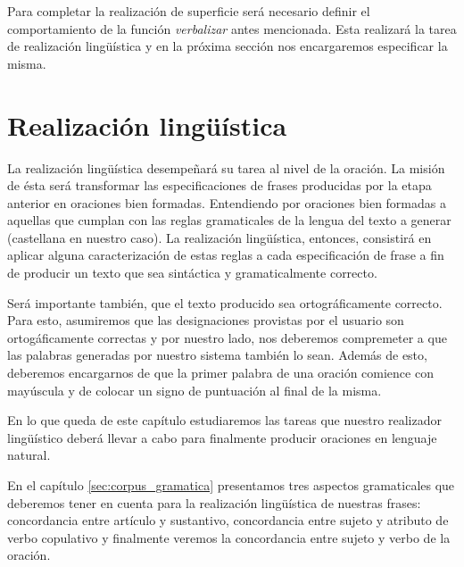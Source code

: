 Para completar la realización de superficie será necesario definir el comportamiento de la función \emph{verbalizar} antes mencionada. Esta realizará la tarea de realización lingüística y en la próxima sección nos encargaremos especificar la misma.





\section{Realización lingüística}
\label{cap:linguistic_realization}

La realización lingüística desempeñará su tarea al nivel de la oración. La misión de ésta será transformar las especificaciones de frases producidas por la etapa anterior en oraciones bien formadas. Entendiendo por oraciones bien formadas a aquellas que cumplan con las reglas gramaticales de la lengua del texto a generar (castellana en nuestro caso). La realización lingüística, entonces, consistirá en aplicar alguna caracterización de estas reglas a cada especificación de frase a fin de producir un texto que sea sintáctica y gramaticalmente correcto.

Será importante también, que el texto producido sea ortográficamente correcto. Para esto, asumiremos que las designaciones provistas por el usuario son ortogáficamente correctas y por nuestro lado, nos deberemos compremeter a que las palabras generadas por nuestro sistema también lo sean. Además de esto, deberemos encargarnos de que la primer palabra de una oración comience con mayúscula y de colocar un signo de puntuación al final de la misma.

En lo que queda de este capítulo estudiaremos las tareas que nuestro realizador lingüístico deberá llevar a cabo para finalmente producir oraciones en lenguaje natural. 

En el capítulo \ref{sec:corpus_gramatica} presentamos tres aspectos gramaticales que deberemos tener en cuenta para la realización lingüística de nuestras frases: concordancia entre artículo y sustantivo, concordancia entre sujeto y atributo de verbo copulativo y finalmente veremos la concordancia entre sujeto y verbo de la oración.


